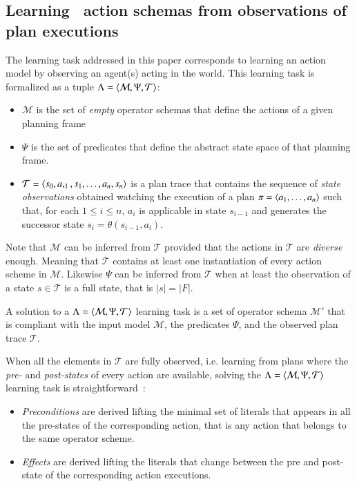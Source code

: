 \subsection{Learning \strips\ action schemas from observations of plan executions}
The learning task addressed in this paper corresponds to learning an action model by observing an agent(s) acting in the world. This learning task is formalized as a tuple $\Lambda={\langle \mathcal{M},\Psi,\mathcal{T} \rangle}$:
\begin{itemize}
\item $\mathcal{M}$ is the set of {\em empty} operator schemas that define the actions of a given planning frame
\item $\Psi$ is the set of predicates that define the abstract state space of that planning frame. 
\item $\mathcal{T}={\langle s_0,a,_1,s_1,\ldots,a_n,s_{n} \rangle}$ is a plan trace that contains the sequence of {\em state observations} obtained watching the execution of a plan $\pi={\langle a_1, \ldots, a_n \rangle}$ such that, for each {\small $1\leq i\leq n$}, $a_i$ is applicable in state $s_{i-1}$ and generates the successor state $s_i=\theta(s_{i-1},a_i)$. 
\end{itemize}
Note that $\mathcal{M}$ can be inferred from $\mathcal{T}$ provided that the actions in $\mathcal{T}$ are {\em diverse} enough. Meaning that $\mathcal{T}$ contains at least one instantiation of every action scheme in $\mathcal{M}$. Likewise $\Psi$ can be inferred from $\mathcal{T}$ when at least the observation of a state $s\in \mathcal{T}$ is a full state, that is $|s|=|F|$.

A solution to a $\Lambda={\langle \mathcal{M},\Psi,\mathcal{T} \rangle}$ learning task is a set of operator schema $\mathcal{M}'$ that is compliant with the input model $\mathcal{M}$, the predicates $\Psi$, and the observed plan trace $\mathcal{T}$.

When all the elements in $\mathcal{T}$ are fully observed, i.e. learning from plans where the {\em pre-} and {\em post-states} of every action are available, solving the $\Lambda={\langle \mathcal{M},\Psi,\mathcal{T} \rangle}$ learning task is straightforward~\cite{jimenez2012review}:
\begin{itemize}
  \item {\em Preconditions} are derived lifting the minimal set of literals that appears in all the pre-states of the corresponding action, that is any action that belongs to the same operator scheme.
  \item {\em Effects} are derived lifting the literals that change between the pre and post-state of the corresponding action executions.
\end{itemize}

